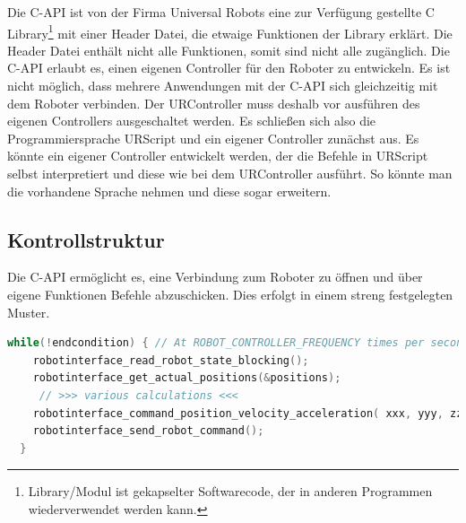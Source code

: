 Die C-API ist von der Firma Universal Robots eine zur Verfügung gestellte C Library\footnote{Library/Modul ist gekapselter Softwarecode, der in anderen Programmen wiederverwendet werden kann.} mit einer Header Datei, die etwaige Funktionen der Library erklärt. Die Header Datei enthält nicht alle Funktionen, somit sind nicht alle zugänglich. Die C-API erlaubt es, einen eigenen Controller für den Roboter zu entwickeln. Es ist nicht möglich, dass mehrere Anwendungen mit der C-API sich gleichzeitig mit dem Roboter verbinden. 
Der URController muss deshalb vor ausführen des eigenen Controllers ausgeschaltet werden. Es schließen sich also die Programmiersprache URScript und ein eigener Controller zunächst aus. Es könnte ein eigener Controller entwickelt werden, der die Befehle in URScript selbst interpretiert und diese wie bei dem URController ausführt. So könnte man die vorhandene Sprache nehmen und diese sogar erweitern.

\subsection{Kontrollstruktur}
\label{capi_control_loop_gru}	

Die C-API ermöglicht es, eine Verbindung zum Roboter zu öffnen und über eigene Funktionen Befehle abzuschicken. Dies erfolgt in einem streng festgelegten Muster.

\begin{lstlisting}[language=C,caption={Beispiel der Kontroll-Struktur}, label=lst:robot_control_loop,captionpos=b]
  while(!endcondition) { // At ROBOT_CONTROLLER_FREQUENCY times per second
    robotinterface_read_robot_state_blocking();
    robotinterface_get_actual_positions(&positions);
     // >>> various calculations <<<
    robotinterface_command_position_velocity_acceleration( xxx, yyy, zzz);
    robotinterface_send_robot_command();
  }
\end{lstlisting}

